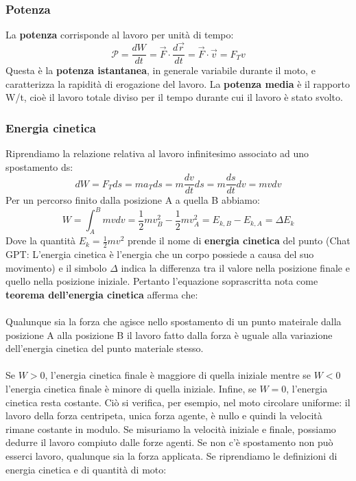 \documentclass{article}
\numberwithin{equation}{subsection}
\begin{document}
\subsubsection{Potenza}
La \textbf{potenza} corrisponde al lavoro per unità di tempo:
\begin{equation}
    \mathcal{P}=\frac{dW}{dt}= \vec{F} \cdot \frac{d\vec{r}}{dt}= \vec{F} \cdot \vec{v}= F_Tv
\end{equation}
Questa è la \textbf{potenza istantanea}, in generale variabile durante il moto, e caratterizza la rapidità di erogazione del lavoro. La \textbf{potenza media} è il rapporto W/t, cioè il lavoro totale diviso per il tempo durante cui il lavoro è stato svolto.
\subsubsection{Energia cinetica}
Riprendiamo la relazione relativa al lavoro infinitesimo associato ad uno spostamento ds:
\begin{equation}
    dW=F_Tds=ma_Tds=m\frac{dv}{dt}ds=m\frac{ds}{dt}dv=mvdv
\end{equation}
Per un percorso finito dalla posizione A a quella B abbiamo:
\begin{equation}
    W=\int_A^Bmvdv=\frac{1}{2}mv^2_B-\frac{1}{2}mv^2_A=E_{k,B} - E_{k,A} = \Delta E_k
\end{equation}
Dove la quantità $E_k=\frac{1}{2}mv^2$ prende il nome di \textbf{energia cinetica} del punto (Chat GPT: L'energia cinetica è l'energia che un corpo possiede a causa del suo movimento) e il simbolo $\Delta$ indica la differenza tra il valore nella posizione finale e quello nella posizione iniziale. Pertanto l'equazione soprascritta nota come \textbf{teorema dell'energia cinetica} afferma che: \\\\
Qualunque sia la forza che agisce nello spostamento di un punto mateirale dalla posizione A alla posizione B il lavoro fatto dalla forza è uguale alla variazione dell'energia cinetica del punto materiale stesso.\\\\
Se $W>0$, l'energia cinetica finale è maggiore di quella iniziale mentre se $W<0$ l'energia cinetica finale è minore di quella iniziale. Infine, se $W=0$, l'energia cinetica resta costante. Ciò si verifica, per esempio, nel moto circolare uniforme: il lavoro della forza centripeta, unica forza agente, è nullo e quindi la velocità rimane costante in modulo. Se misuriamo la velocità iniziale e finale, possiamo dedurre il lavoro compiuto dalle forze agenti. Se non c'è spostamento non può esserci lavoro, qualunque sia la forza applicata. Se riprendiamo le definizioni di energia cinetica e di quantità di moto:
\end{document}
